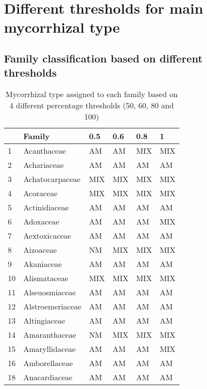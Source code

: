 \documentclass[]{article}
\begin{document}
\hypertarget{different-thresholds-for-main-mycorrhizal-type}{%
\section{Different thresholds for main mycorrhizal
type}\label{different-thresholds-for-main-mycorrhizal-type}}

\hypertarget{family-classification-based-on-different-thresholds}{%
\subsection{Family classification based on different
thresholds}\label{family-classification-based-on-different-thresholds}}

\begin{longtable}{l|l|l|l|l|l}
\caption{\label{tab:unnamed-chunk-5}Mycorrhizal type assigned to each family based on 4 different percentage thresholds (50, 60, 80 and 100)}\\
\hline
  & Family & 0.5 & 0.6 & 0.8 & 1\\
\hline
1 & Acanthaceae & AM & AM & MIX & MIX\\
\hline
2 & Achariaceae & AM & AM & AM & AM\\
\hline
3 & Achatocarpaceae & MIX & MIX & MIX & MIX\\
\hline
4 & Acoraceae & MIX & MIX & MIX & MIX\\
\hline
5 & Actinidiaceae & AM & AM & AM & AM\\
\hline
6 & Adoxaceae & AM & AM & AM & MIX\\
\hline
7 & Aextoxicaceae & AM & AM & AM & AM\\
\hline
8 & Aizoaceae & NM & MIX & MIX & MIX\\
\hline
9 & Akaniaceae & AM & AM & AM & AM\\
\hline
10 & Alismataceae & MIX & MIX & MIX & MIX\\
\hline
11 & Alseuosmiaceae & AM & AM & AM & AM\\
\hline
12 & Alstroemeriaceae & AM & AM & AM & AM\\
\hline
13 & Altingiaceae & AM & AM & AM & AM\\
\hline
14 & Amaranthaceae & NM & MIX & MIX & MIX\\
\hline
15 & Amaryllidaceae & AM & AM & AM & MIX\\
\hline
16 & Amborellaceae & AM & AM & AM & AM\\
\hline
18 & Anacardiaceae & AM & AM & AM & AM\\

\end{longtable}
\end{document}
